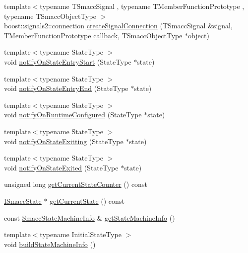 \begin{DoxyCompactItemize}
\item 
{\footnotesize template$<$typename T\+Smacc\+Signal , typename T\+Member\+Function\+Prototype , typename T\+Smacc\+Object\+Type $>$ }\\boost\+::signals2\+::connection \hyperlink{classsmacc_1_1ISmaccStateMachine_adf0f42ade0c65cc471960fe2a7c42da2}{create\+Signal\+Connection} (T\+Smacc\+Signal \&signal, T\+Member\+Function\+Prototype \hyperlink{3_2servers_2opencv__perception__node_2opencv__perception__node_8cpp_a050e697bd654facce10ea3f6549669b3}{callback}, T\+Smacc\+Object\+Type $\ast$object)
\item 
{\footnotesize template$<$typename State\+Type $>$ }\\void \hyperlink{classsmacc_1_1ISmaccStateMachine_aeec54e997d715b105ebfeb5caadc4fbf}{notify\+On\+State\+Entry\+Start} (State\+Type $\ast$state)
\item 
{\footnotesize template$<$typename State\+Type $>$ }\\void \hyperlink{classsmacc_1_1ISmaccStateMachine_a856cf2d25d84659b974cccfbf44aeec9}{notify\+On\+State\+Entry\+End} (State\+Type $\ast$state)
\item 
{\footnotesize template$<$typename State\+Type $>$ }\\void \hyperlink{classsmacc_1_1ISmaccStateMachine_a7377ca0f79289fdc27f9ed3ff6e67263}{notify\+On\+Runtime\+Configured} (State\+Type $\ast$state)
\item 
{\footnotesize template$<$typename State\+Type $>$ }\\void \hyperlink{classsmacc_1_1ISmaccStateMachine_a707c36f8b02eeed1af624dd36a5a4957}{notify\+On\+State\+Exitting} (State\+Type $\ast$state)
\item 
{\footnotesize template$<$typename State\+Type $>$ }\\void \hyperlink{classsmacc_1_1ISmaccStateMachine_ac352013a5df0dcce0594f1466b9a6f7b}{notify\+On\+State\+Exited} (State\+Type $\ast$state)
\item 
unsigned long \hyperlink{classsmacc_1_1ISmaccStateMachine_aad27c0182b53245d0aded22e63cd83bd}{get\+Current\+State\+Counter} () const
\item 
\hyperlink{classsmacc_1_1ISmaccState}{I\+Smacc\+State} $\ast$ \hyperlink{classsmacc_1_1ISmaccStateMachine_a610d09dc5341fb63732be713c21fbe86}{get\+Current\+State} () const
\item 
const \hyperlink{classsmacc_1_1introspection_1_1SmaccStateMachineInfo}{Smacc\+State\+Machine\+Info} \& \hyperlink{classsmacc_1_1ISmaccStateMachine_a3b1facb0477325fe43b447fc21d9eb7d}{get\+State\+Machine\+Info} ()
\item 
{\footnotesize template$<$typename Initial\+State\+Type $>$ }\\void \hyperlink{classsmacc_1_1ISmaccStateMachine_a8e9c16ed0dc3dfc878548a8c6f3c47d7}{build\+State\+Machine\+Info} ()
\end{DoxyCompactItemize}
